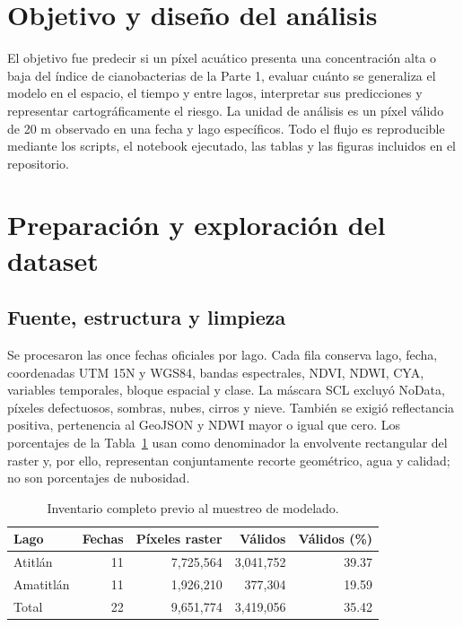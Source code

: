 \documentclass[11pt,letterpaper]{article}
\begin{document}
\tableofcontents
\newpage
{}

\section{Objetivo y diseño del análisis}

El objetivo fue predecir si un píxel acuático presenta una concentración alta o baja del índice de cianobacterias de la Parte 1, evaluar cuánto se generaliza el modelo en el espacio, el tiempo y entre lagos, interpretar sus predicciones y representar cartográficamente el riesgo. La unidad de análisis es un píxel válido de 20 m observado en una fecha y lago específicos. Todo el flujo es reproducible mediante los scripts, el notebook ejecutado, las tablas y las figuras incluidos en el repositorio.

\section{Preparación y exploración del dataset}

\subsection{Fuente, estructura y limpieza}

Se procesaron las once fechas oficiales por lago. Cada fila conserva lago, fecha, coordenadas UTM 15N y WGS84, bandas espectrales, NDVI, NDWI, CYA, variables temporales, bloque espacial y clase. La máscara SCL excluyó NoData, píxeles defectuosos, sombras, nubes, cirros y nieve. También se exigió reflectancia positiva, pertenencia al GeoJSON y NDWI mayor o igual que cero. Los porcentajes de la Tabla~\ref{tab:limpieza} usan como denominador la envolvente rectangular del raster y, por ello, representan conjuntamente recorte geométrico, agua y calidad; no son porcentajes de nubosidad.

\begin{table}[H]
\centering
\caption{Inventario completo previo al muestreo de modelado.}
\label{tab:limpieza}
\begin{tabular}{lrrrr}
\toprule
Lago & Fechas & Píxeles raster & Válidos & Válidos (\%)\\
\midrule
Atitlán & 11 & 7,725,564 & 3,041,752 & 39.37\\
Amatitlán & 11 & 1,926,210 & 377,304 & 19.59\\
\midrule
Total & 22 & 9,651,774 & 3,419,056 & 35.42\\
\bottomrule
\end{tabular}
\end{table}
\end{document}
